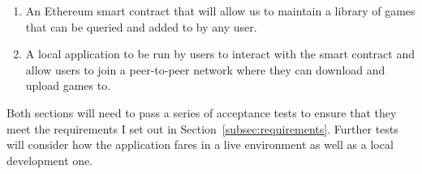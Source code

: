 \begin{enumerate}
  \item An Ethereum smart contract that will allow us to maintain a library of games that can be queried and added to by any user.
  \item A local application to be run by users to interact with the smart contract and allow users to join a peer-to-peer network where they can download and upload games to.
\end{enumerate}

\vspace{2mm}\noindent
Both sections will need to pass a series of acceptance tests to ensure that they meet the requirements I set out in Section~\ref{subsec:requirements}. Further tests will consider how the application fares in a live environment as well as a local development one. 
